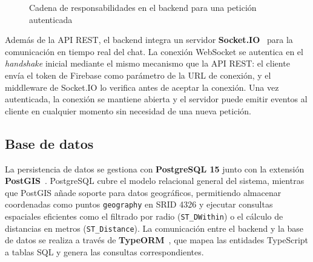 \begin{figure}[H]
\centering
{}
\caption{Cadena de responsabilidades en el backend para una petición autenticada}
\label{fig:flujo_backend}
\end{figure}

Además de la API REST, el backend integra un servidor \textbf{Socket.IO}~\cite{socketio} para la comunicación en tiempo real del chat. La conexión WebSocket se autentica en el \textit{handshake} inicial mediante el mismo mecanismo que la API REST: el cliente envía el token de Firebase como parámetro de la URL de conexión, y el middleware de Socket.IO lo verifica antes de aceptar la conexión. Una vez autenticada, la conexión se mantiene abierta y el servidor puede emitir eventos al cliente en cualquier momento sin necesidad de una nueva petición.

\subsection{Base de datos}

La persistencia de datos se gestiona con \textbf{PostgreSQL 15} junto con la extensión \textbf{PostGIS}~\cite{postgisdocs}. PostgreSQL cubre el modelo relacional general del sistema, mientras que PostGIS añade soporte para datos geográficos, permitiendo almacenar coordenadas como puntos \texttt{geography} en SRID 4326 y ejecutar consultas espaciales eficientes como el filtrado por radio (\texttt{ST\_DWithin}) o el cálculo de distancias en metros (\texttt{ST\_Distance}). La comunicación entre el backend y la base de datos se realiza a través de \textbf{TypeORM}~\cite{typeorm}, que mapea las entidades TypeScript a tablas SQL y genera las consultas correspondientes.

